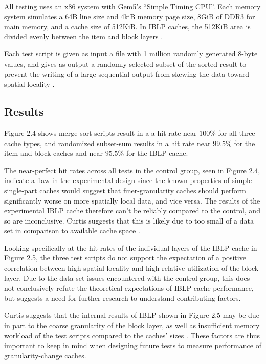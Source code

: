 \documentclass[12pt,twoside]{reedthesis}
\begin{document}
	All testing uses an x86 system with Gem5's ``Simple Timing CPU''. Each memory system simulates a 64B line size and 4kiB memory page size, 8GiB of DDR3 for main memory, and a cache size of 512KiB. In IBLP caches, the 512KiB area is divided evenly between the item and block layers \cite{curtis}.

	Each test script is given as input a file with 1 million randomly generated 8-byte values, and gives as output a randomly selected subset of the sorted result to prevent the writing of a large sequential output from skewing the data toward spatial locality \cite{curtis}.

	\subsection*{Results}

	Figure 2.4 shows merge sort scripts result in a a hit rate near $100\%$ for all three cache types, and randomized subset-sum results in a hit rate near $99.5\%$ for the item and block caches and near $95.5\%$ for the IBLP cache.
	
	The near-perfect hit rates across all tests in the control group, seen in Figure 2.4, indicate a flaw in the experimental design since the known properties of simple single-part caches would suggest that finer-granularity caches should perform significantly worse on more spatially local data, and vice versa. The results of the experimental IBLP cache therefore can't be reliably compared to the control, and so are inconclusive. Curtis suggests that this is likely due to too small of a data set in comparison to available cache space \cite{curtis}.

	Looking specifically at the hit rates of the individual layers of the IBLP cache in Figure 2.5, the three test scripts do not support the expectation of a positive correlation between high spatial locality and high relative utilization of the block layer. Due to the data set issues encountered with the control group, this does not conclusively refute the theoretical expectations of IBLP cache performance, but suggests a need for further research to understand contributing factors.
	
	Curtis suggests that the internal results of IBLP shown in Figure 2.5 may be due in part to the coarse granularity of the block layer, as well as insufficient memory workload of the test scripts compared to the caches' sizes \cite{curtis}. These factors are thus important to keep in mind when designing future tests to measure performance of granularity-change caches.
\end{document}
